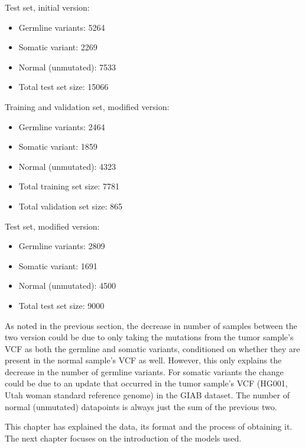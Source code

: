\documentclass[bsc,frontabs,singlespacing,parskip,deptreport]{infthesis}
\begin{document}
Test set, initial version:

\begin{itemize}

\item Germline variants: 5264 
\item Somatic variant: 2269 
\item Normal (unmutated): 7533
\item Total test set size: 15066 

\end{itemize}

Training and validation set, modified version:

\begin{itemize}

\item Germline variants: 2464 
\item Somatic variant: 1859 
\item Normal (unmutated): 4323 
\item Total training set size: 7781 
\item Total validation set size: 865

\end{itemize}

Test set, modified version:

\begin{itemize}

\item Germline variants: 2809 
\item Somatic variant: 1691 
\item Normal (unmutated): 4500
\item Total test set size: 9000 

\end{itemize}

As noted in the previous section, the decrease in number of samples between the two version could be due to only taking the mutations from the tumor sample's VCF as both the germline and somatic variants, conditioned on whether they are present in the normal sample's VCF as well. However, this only explains the decrease in the number of germline variants. For somatic variants the change could be due to an update that occurred in the tumor sample's VCF (HG001, Utah woman standard reference genome) in the GIAB dataset. The number of normal (unmutated) datapoints is always just the sum of the previous two.

This chapter has explained the data, its format and the process of obtaining it. The next chapter focuses on  the introduction of the models used.
\end{document}
